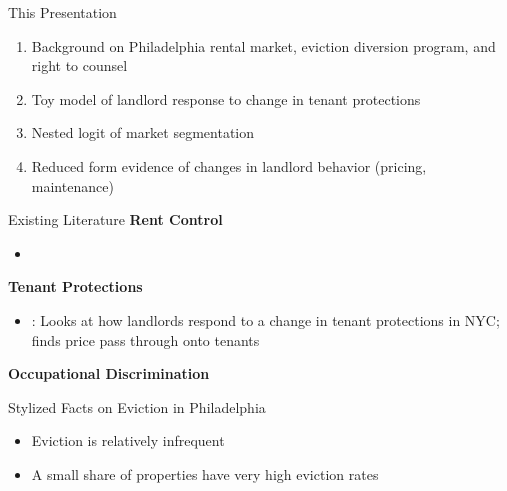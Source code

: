 \documentclass[10pt, xcolor=dvipsnames]{beamer}
\begin{document}
\begin{frame}{This Presentation}
    \begin{enumerate}
        \item Background on Philadelphia rental market, eviction diversion program, and right to counsel
        \item Toy model of landlord response to change in tenant protections
        \item Nested logit of market segmentation
        \item Reduced form evidence of changes in landlord behavior (pricing, maintenance)
    \end{enumerate}
    
\end{frame}

\begin{frame}{Existing Literature}
    \textbf{Rent Control}
    \begin{itemize}
        \item 
    \end{itemize}
    \textbf{Tenant Protections}
    \begin{itemize}
        \item \cite{humphries-2024}: Looks at how landlords respond to a change in tenant protections in NYC; finds price pass through onto tenants
    \end{itemize}
    \textbf{Occupational Discrimination}
    
\end{frame}

\begin{frame}{Stylized Facts on Eviction in Philadelphia}
    \begin{itemize}
        \item Eviction is relatively infrequent
        \item A small share of properties have very high eviction rates
    \end{itemize}
    
\end{frame}
\end{document}
